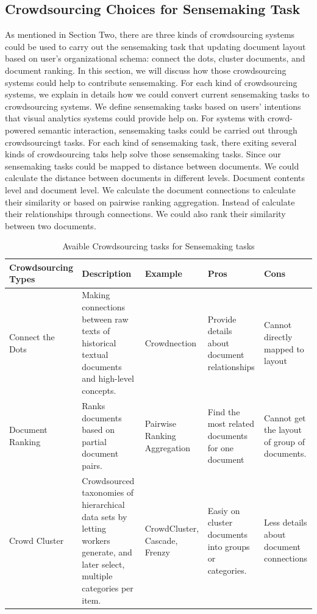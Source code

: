 \documentclass[journal]{vgtc}                %
\begin{document}
\subsection{Crowdsourcing Choices for Sensemaking Task}

As mentioned in Section Two, there are three kinds of crowdsourcing systems could be used to carry out the sensemaking task that updating document layout based on user's organizational schema: connect the dots, cluster documents, and document ranking. In this section, we will discuss how those crowdsourcing systems could help to contribute sensemaking. For each kind of crowdsourcing systems, we explain in details how we could convert current sensemaking tasks to crowdsourcing systems.
We define sensemaking tasks based on users' intentions that visual analytics systems could provide help on.  For systems with crowd-powered semantic interaction, sensemaking tasks could be carried out through crowdsourcingt tasks. For each kind of sensemaking task, there exiting several kinds of crowdsourcing taks help solve those sensemaking tasks.
Since our sensemaking tasks could be mapped to distance between documents. We could calculate the distance between documents in different levels. Document contents level and document level. We calculate the document connections to calculate their similarity or based on pairwise ranking aggregation. Instead of calculate their relationships through connections. We could also rank their similarity between two documents.

\begin{table}[t]
  \caption{Avaible Crowdsourcing tasks for Sensemaking tasks}
  \label{tab:tasks}
  \centering
  \begin{tabular}{| m{2cm} | m{5cm} | m{2cm} |  m{3cm} | m{3cm}|}
  \hline
   Crowdsourcing Types & Description & Example & Pros & Cons\\
  \hline

  Connect the Dots &  Making connections between raw texts of historical textual documents and high-level concepts. & Crowdnection & Provide details about document relationships & Cannot directly mapped to layout \\ \hline
  Document Ranking & Ranks documents based on partial document pairs. & Pairwise Ranking Aggregation & Find the most related documents for one document & Cannot get the layout of group of documents. \\  \hline
  Crowd Cluster & Crowdsourced taxonomies of hierarchical data sets by letting workers generate, and later select, multiple categories per item. &CrowdCluster, Cascade, Frenzy & Easiy on cluster documents into groups or categories. & Less details about document connections\\ \hline
\end{tabular}
\end{table}
\end{document}
